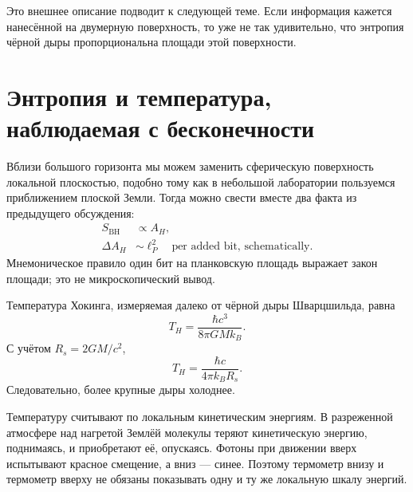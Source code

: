 Это внешнее описание подводит к следующей теме. Если информация кажется нанесённой на двумерную поверхность, то уже не так удивительно, что энтропия чёрной дыры пропорциональна площади этой поверхности.

\section{Энтропия и температура, наблюдаемая с бесконечности}

Вблизи большого горизонта мы можем заменить сферическую поверхность локальной плоскостью, подобно тому как в небольшой лаборатории пользуемся приближением плоской Земли. Тогда можно свести вместе два факта из предыдущего обсуждения:
\begin{equation}
\begin{aligned}
S_{\mathrm{BH}}&\propto A_H,\\
\Delta A_H&\sim \ell_P^2
\quad\text{per added bit, schematically}.
\end{aligned}
\end{equation}
Мнемоническое правило один бит на планковскую площадь выражает закон площади; это не микроскопический вывод.

Температура Хокинга, измеряемая далеко от чёрной дыры Шварцшильда, равна
\begin{equation}
T_H=\frac{\hbar c^3}{8\pi GMk_B}.
\label{eq:l05-hawking}
\end{equation}
С учётом \(R_s=2GM/c^2\),
\begin{equation}
T_H=\frac{\hbar c}{4\pi k_B R_s}.
\label{eq:l05-hawking-radius}
\end{equation}
Следовательно, более крупные дыры холоднее.

\begin{classroomqa}
\end{classroomqa}

Температуру считывают по локальным кинетическим энергиям. В разреженной атмосфере над нагретой Землёй молекулы теряют кинетическую энергию, поднимаясь, и приобретают её, опускаясь. Фотоны при движении вверх испытывают красное смещение, а вниз — синее. Поэтому термометр внизу и термометр вверху не обязаны показывать одну и ту же локальную шкалу энергий.

